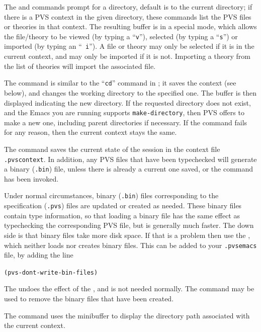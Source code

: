 The  and  commands prompt for a
directory, default is to the current directory; if there is a PVS
context in the given directory, these commands list the PVS files or
theories in that context.  The resulting buffer is in a special mode,
which allows the file/theory to be viewed (by typing a ``\texttt{v}''),
selected (by typing a ``\texttt{s}'') or imported (by typing an ``{\tt
i}'').  A file or theory may only be selected if it is in the current
context, and may only be imported if it is not.  Importing a theory from
the list of theories will import the associated file.

The  command is similar to the ``\texttt{cd}'' command
in \unix; it saves the context (see below), and changes the working
directory to the specified one.  The  buffer is then
displayed indicating the new directory.  If the requested directory does
not exist, and the Emacs you are running supports \texttt{make-directory},
then PVS offers to make a new one, including parent directories if necessary.
If the command fails for any reason, then the current context
stays the same.

The  command saves the current state of the session in
the context file \texttt{.pvscontext}.  In addition, any PVS files that
have been typechecked will generate a binary (\texttt{.bin}) file, unless
there is already a current one saved, or the 
command has been invoked.

Under normal circumstances, binary (\texttt{.bin}) files  corresponding to
the specification (\texttt{.pvs}) files are updated or created as needed.
These binary files contain type information, so that loading a binary file
has the same effect as typechecking the corresponding PVS file, but is
generally much faster.  The down side is that binary files take more disk
space.  If that is a problem then use the ,
which neither loads nor creates binary files.  This can be added to your
\texttt{.pvsemacs} file, by adding the
line
\begin{alltt}
  (pvs-dont-write-bin-files)
\end{alltt}
The  undoes the effect of the
, and is not needed normally.  The
 command may be used to remove the binary files
that have been created.

The  command uses the minibuffer to display the
directory path associated with the current context.

